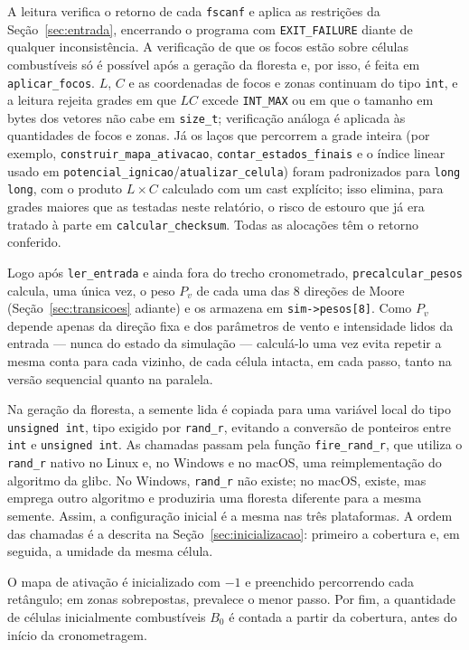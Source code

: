 \documentclass[12pt,a4paper]{article}
\begin{document}
A leitura verifica o retorno de cada \texttt{fscanf} e aplica as
restrições da Seção~\ref{sec:entrada}, encerrando o programa com \texttt{EXIT\_FAILURE}
diante de qualquer inconsistência. A verificação de que os focos estão
sobre células combustíveis só é possível após a geração da floresta e,
por isso, é feita em \texttt{aplicar\_focos}. $L$, $C$ e as coordenadas
de focos e zonas continuam do tipo \texttt{int}, e a leitura rejeita
grades em que $LC$ excede \texttt{INT\_MAX} ou em que o tamanho em bytes
dos vetores não cabe em \texttt{size\_t}; verificação análoga é aplicada
às quantidades de focos e zonas. Já os laços que percorrem a grade
inteira (por exemplo, \texttt{construir\_mapa\_ativacao},
\texttt{contar\_estados\_finais} e o índice linear usado em
\texttt{potencial\_ignicao}/\texttt{atualizar\_celula}) foram
padronizados para \texttt{long long}, com o produto $L\times C$ calculado
com um cast explícito; isso elimina, para grades maiores que as testadas
neste relatório, o risco de estouro que já era tratado à parte em
\texttt{calcular\_checksum}. Todas as alocações têm o retorno conferido.

Logo após \texttt{ler\_entrada} e ainda fora do trecho cronometrado,
\texttt{precalcular\_pesos} calcula, uma única vez, o peso $P_v$ de cada
uma das 8 direções de Moore (Seção~\ref{sec:transicoes} adiante) e os
armazena em \texttt{sim->pesos[8]}. Como $P_v$ depende apenas da direção
fixa e dos parâmetros de vento e intensidade lidos da entrada --- nunca
do estado da simulação --- calculá-lo uma vez evita repetir a mesma
conta para cada vizinho, de cada célula intacta, em cada passo, tanto na
versão sequencial quanto na paralela.

Na geração da floresta, a semente lida é copiada para uma variável
local do tipo \texttt{unsigned int}, tipo exigido por \texttt{rand\_r},
evitando a conversão de ponteiros entre \texttt{int} e
\texttt{unsigned int}. As chamadas passam pela função
\texttt{fire\_rand\_r}, que utiliza o \texttt{rand\_r} nativo no
Linux e, no Windows e no macOS, uma reimplementação do algoritmo da
glibc. No Windows, \texttt{rand\_r} não existe; no macOS, existe, mas
emprega outro algoritmo e produziria uma floresta diferente para a mesma
semente. Assim, a configuração inicial é a mesma nas três plataformas. A ordem das chamadas é a descrita
na Seção~\ref{sec:inicializacao}: primeiro a cobertura e, em seguida, a
umidade da mesma célula.

O mapa de ativação é inicializado com $-1$ e preenchido percorrendo cada
retângulo; em zonas sobrepostas, prevalece o menor passo. Por fim, a
quantidade de células inicialmente combustíveis $B_0$ é contada a partir
da cobertura, antes do início da cronometragem.
\end{document}
